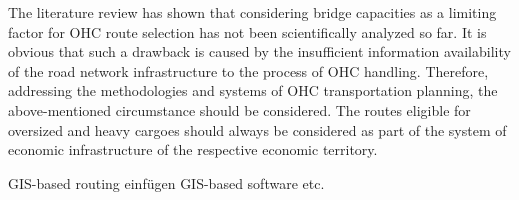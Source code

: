 The literature review has shown that considering bridge capacities as a limiting factor for OHC route selection has not been scientifically analyzed so far. It is obvious that such a drawback is caused by the insufficient information availability of the road network infrastructure to the process of OHC handling. Therefore, addressing the methodologies and systems of OHC transportation planning, the above-mentioned circumstance should be considered. The routes eligible for oversized and heavy cargoes should always be considered as part of the system of economic infrastructure of the respective economic territory. 

GIS-based routing einfügen 
GIS-based software etc. 
